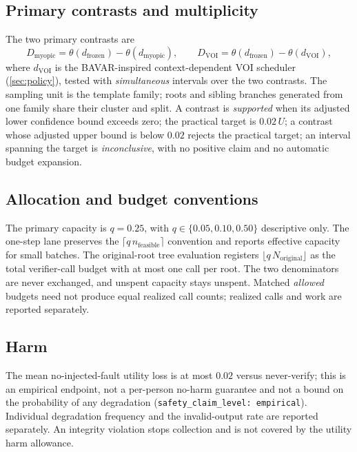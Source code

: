 \subsection{Primary contrasts and multiplicity}

The two primary contrasts are
\begin{equation}
 D_{\mathrm{myopic}}=\theta(d_{\mathrm{frozen}})-\theta(d_{\mathrm{myopic}}),
 \qquad
 D_{\mathrm{VOI}}=\theta(d_{\mathrm{frozen}})-\theta(d_{\mathrm{VOI}}),
 \label{eq:primary-contrasts}
\end{equation}
where $d_{\mathrm{VOI}}$ is the BAVAR-inspired context-dependent VOI scheduler
(\cref{sec:policy}), tested with \emph{simultaneous} intervals over the two
contrasts.  The sampling
unit is the template family; roots and sibling branches generated from one family
share their cluster and split.  A contrast is \emph{supported} when its adjusted
lower confidence bound exceeds zero; the practical target is $0.02\,U$; a
contrast whose adjusted upper bound is below $0.02$ rejects the practical target;
an interval spanning the target is \emph{inconclusive}, with no positive claim
and no automatic budget expansion.

\subsection{Allocation and budget conventions}

The primary capacity is $q=0.25$, with $q\in\{0.05,0.10,0.50\}$ descriptive
only.  The one-step lane preserves the $\lceil q\,n_{\text{feasible}}\rceil$
convention and reports effective capacity for small batches.  The original-root
tree evaluation registers $\lfloor q\,N_{\text{original}}\rfloor$ as the total
verifier-call budget with at most one call per root.  The two denominators are
never exchanged, and unspent capacity stays unspent.  Matched \emph{allowed}
budgets need not produce equal realized call counts; realized calls and work are
reported separately.

\subsection{Harm}

The mean no-injected-fault utility loss is at most $0.02$ versus never-verify;
this is an empirical endpoint, not a per-person no-harm guarantee and not a bound
on the probability of any degradation
(\texttt{safety\_claim\_level: empirical}).  Individual degradation frequency
and the invalid-output rate are reported separately.  An integrity violation
stops collection and is not covered by the utility harm allowance.

